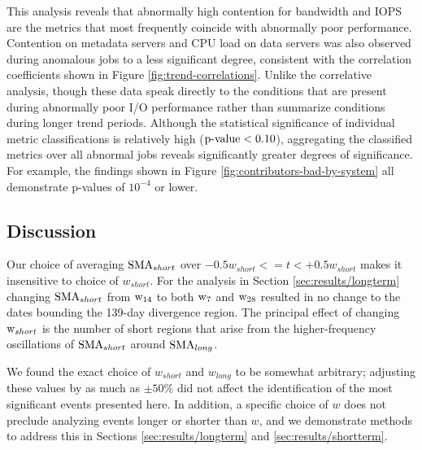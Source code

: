 This analysis reveals that abnormally high contention for bandwidth and IOPS are the metrics that most frequently coincide with abnormally poor performance.
Contention on metadata servers and CPU load on data servers was also observed during anomalous jobs to a less significant degree, consistent with the correlation coefficients shown in Figure \ref{fig:trend-correlations}.
Unlike the correlative analysis, though these data speak directly to the conditions that are present during abnormally poor I/O performance rather than summarize conditions during longer trend periods.
Although the statistical significance of individual metric classifications is relatively high (${\textup{p-value} < 0.10}$), aggregating the classified metrics over all abnormal jobs reveals significantly greater degrees of significance.
For example, the findings shown in Figure \ref{fig:contributors-bad-by-system} all demonstrate p-values of $10^{-4}$ or lower.





\subsection {Discussion}
\label{sec:results/discussion}


Our choice of averaging $\textup{SMA}_{short}$ over ${-0.5w_{short} <= t < +0.5w_{short}}$ makes it insensitive to choice of $w_{short}$.
For the analysis in Section \ref{sec:results/longterm} changing $\textup{SMA}_{short}$ from $\textup{w}_{14}$ to both $\textup{w}_{7}$ and $\textup{w}_{28}$ resulted in no change to the dates bounding the 139-day divergence region.
The principal effect of changing $\textup{w}_{short}$ is the number of short regions that arise from the higher-frequency oscillations of $\textup{SMA}_{short}$ around $\textup{SMA}_{long}$.


We found the exact choice of $w_{short}$ and $w_{long}$ to be somewhat arbitrary; adjusting these values by as much as $\pm 50\%$ did not affect the identification of the most significant events presented here.
In addition, a specific choice of $w$ does not preclude analyzing events longer or shorter than $w$, and we demonstrate methods to address this in Sections \ref{sec:results/longterm} and \ref{sec:results/shortterm}.

